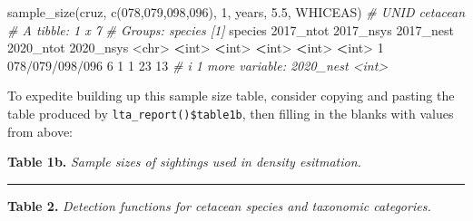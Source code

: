 \documentclass[
]{book}
\newenvironment{Shaded}{\begin{snugshade}}{\end{snugshade}}
\newcommand{\AttributeTok}[1]{\textcolor[rgb]{0.77,0.63,0.00}{#1}}
\newcommand{\CommentTok}[1]{\textcolor[rgb]{0.56,0.35,0.01}{\textit{#1}}}
\newcommand{\DecValTok}[1]{\textcolor[rgb]{0.00,0.00,0.81}{#1}}
\newcommand{\ErrorTok}[1]{\textcolor[rgb]{0.64,0.00,0.00}{\textbf{#1}}}
\newcommand{\FloatTok}[1]{\textcolor[rgb]{0.00,0.00,0.81}{#1}}
\newcommand{\FunctionTok}[1]{\textcolor[rgb]{0.00,0.00,0.00}{#1}}
\newcommand{\NormalTok}[1]{#1}
\newcommand{\SpecialCharTok}[1]{\textcolor[rgb]{0.00,0.00,0.00}{#1}}
\newcommand{\StringTok}[1]{\textcolor[rgb]{0.31,0.60,0.02}{#1}}
\begin{document}
\begin{Shaded}
\begin{Highlighting}[]
\FunctionTok{sample\_size}\NormalTok{(cruz, }\FunctionTok{c}\NormalTok{(}\StringTok{\textquotesingle{}078\textquotesingle{}}\NormalTok{,}\StringTok{\textquotesingle{}079\textquotesingle{}}\NormalTok{,}\StringTok{\textquotesingle{}098\textquotesingle{}}\NormalTok{,}\StringTok{\textquotesingle{}096\textquotesingle{}}\NormalTok{), }
            \DecValTok{1}\NormalTok{, years, }\FloatTok{5.5}\NormalTok{, }\StringTok{\textquotesingle{}WHICEAS\textquotesingle{}}\NormalTok{) }\CommentTok{\# UNID cetacean}
\CommentTok{\# A tibble: 1 x 7}
\CommentTok{\# Groups:   species [1]}
\NormalTok{  species         }\StringTok{\textasciigrave{}}\AttributeTok{2017\_ntot}\StringTok{\textasciigrave{}} \StringTok{\textasciigrave{}}\AttributeTok{2017\_nsys}\StringTok{\textasciigrave{}} \StringTok{\textasciigrave{}}\AttributeTok{2017\_nest}\StringTok{\textasciigrave{}} \StringTok{\textasciigrave{}}\AttributeTok{2020\_ntot}\StringTok{\textasciigrave{}} \StringTok{\textasciigrave{}}\AttributeTok{2020\_nsys}\StringTok{\textasciigrave{}}
  \SpecialCharTok{\textless{}}\NormalTok{chr}\SpecialCharTok{\textgreater{}}                 \ErrorTok{\textless{}}\NormalTok{int}\SpecialCharTok{\textgreater{}}       \ErrorTok{\textless{}}\NormalTok{int}\SpecialCharTok{\textgreater{}}       \ErrorTok{\textless{}}\NormalTok{int}\SpecialCharTok{\textgreater{}}       \ErrorTok{\textless{}}\NormalTok{int}\SpecialCharTok{\textgreater{}}       \ErrorTok{\textless{}}\NormalTok{int}\SpecialCharTok{\textgreater{}}
\DecValTok{1} \DecValTok{078}\SpecialCharTok{/}\DecValTok{079}\SpecialCharTok{/}\DecValTok{098}\SpecialCharTok{/}\DecValTok{096}           \DecValTok{6}           \DecValTok{1}           \DecValTok{1}          \DecValTok{23}          \DecValTok{13}
\CommentTok{\# i 1 more variable: \textasciigrave{}2020\_nest\textasciigrave{} \textless{}int\textgreater{}}
\end{Highlighting}
\end{Shaded}

To expedite building up this sample size table, consider copying and pasting the table produced by \texttt{lta\_report()\$table1b}, then filling in the blanks with values from above:

\textbf{Table 1b.} \emph{Sample sizes of sightings used in density esitmation.}

\begin{center}\rule{0.5\linewidth}{0.5pt}\end{center}

\textbf{Table 2.} \emph{Detection functions for cetacean species and taxonomic categories.}
\end{document}
